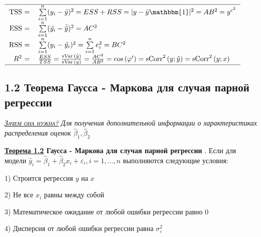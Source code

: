 \documentclass[a0,final]{a0poster}
\DeclareMathOperator{\sCorr}{sCorr}
\DeclareMathOperator{\Var}{Var}
\DeclareMathOperator{\sVar}{sVar}
\DeclareMathOperator{\E}{E}
\begin{document}
\begin{multicols}{4}
\begin{center}
\begin{math}
\begin{tabular}{r  l}
\hline
TSS = & $\sum\limits_{i=1}^n (y_i-\bar{y})^2 = ESS + RSS = |y- \bar{y}\mathbbm {1}|^2 = AB^2 = y^{c^2}$ \\
ESS = & $\sum\limits_{i=1}^n (\hat{y_i}- \bar{\hat{y}})^2 = AC^2$ \\
RSS = & $\sum\limits_{i=1}^{n}(y_i-\hat{y_i})^2 = \sum\limits_{i=1}^{n}e^2_i = BC^2$\\
$R^2$ = & $\frac{ESS}{TSS} = \frac{ \sVar{(\hat{y})}}{ \sVar{(y)}} = \frac{AC^2}{AB^2} = \cos{(\varphi')} = \sCorr^2{(y;\hat{y})} = \sCorr^2{(y;x)}$\\
\hline
\end{tabular}
\end{math}
\end{center}

\subsection*{\textbf{1.2 Теорема Гаусса - Маркова для случая парной регрессии}}
\underline{\textsc{\textit{Зачем она нужна?}}} \textit{Для получения дополнительной информации о характеристиках распределения оценок $\hat{\beta}_1, \hat{\beta}_2$} \\
\begin{tcolorbox}[colback=red!5!white,colframe=red!75!black]
\textbf{\underline{Теорема 1.2} Гаусса - Маркова для случая парной регрессии }. Если для модели $\hat{y}_i=\hat{\beta}_1 + \hat{\beta}_2x_i + \varepsilon_i, i = 1,...,n$ выполняются следующие условия:

1) Строится регрессия $y$ на $x$

2) Не все $x_i$ равны между собой

3) %
Математическое ожидание от любой ошибки регрессии равно 0

4) %
Дисперсия от любой ошибки регрессии равна $\sigma_{\varepsilon}^2$



\end{tcolorbox}
\end{multicols}
\end{document}
